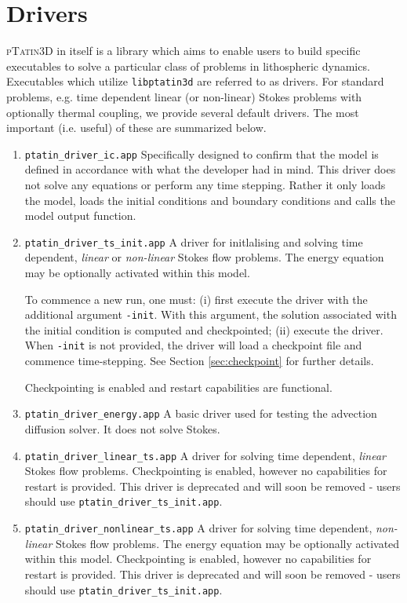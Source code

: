 \documentclass[paper=a4, fontsize=10pt,twoside]{scrartcl}
\newcommand{\ptat}{{{\textsc{pTatin3D}}}}
\newcommand{\unix}[1]{\texttt{\footnotesize #1}}
\begin{document}
\section{Drivers}
{\ptat} in itself is a library which aims to enable users to build specific executables to solve a particular class of problems in lithospheric dynamics.
Executables which utilize \unix{libptatin3d} are referred to as drivers.
For standard problems, e.g. time dependent linear (or non-linear) Stokes problems with optionally thermal coupling, we provide several default drivers.
The most important (i.e. useful) of these are summarized below.

\begin{enumerate}
	\item \unix{ptatin\_driver\_ic.app}
	Specifically designed to confirm that the model is defined in accordance with what the developer had in mind. This driver does not solve any equations or perform any time stepping. Rather it only loads the model, loads the initial conditions and boundary conditions and calls the model output function.

	\item \unix{ptatin\_driver\_ts\_init.app}
	A driver for initlalising and solving time dependent, \emph{linear} or \emph{non-linear} Stokes flow problems. 
	The energy equation may be optionally activated within this model.

	To commence a new run, one must: (i) first execute the driver with the additional argument \texttt{-init}.
	With this argument, the solution associated with the initial condition is computed and checkpointed;
	(ii) execute the driver. When \texttt{-init} is not provided, the driver will load a checkpoint file and commence
	time-stepping. See Section \ref{sec:checkpoint} for further details.

	Checkpointing is enabled and restart capabilities are functional.
	
	\item \unix{ptatin\_driver\_energy.app}
	A basic driver used for testing the advection diffusion solver. It does not solve Stokes.
	
	\item \unix{ptatin\_driver\_linear\_ts.app}
	A driver for solving time dependent, \emph{linear} Stokes flow problems. 
	Checkpointing is enabled, however no capabilities for restart is provided.
	This driver is deprecated and will soon be removed - users should use \unix{ptatin\_driver\_ts\_init.app}.

	\item \unix{ptatin\_driver\_nonlinear\_ts.app}
	A driver for solving time dependent, \emph{non-linear} Stokes flow problems. 
	The energy equation may be optionally activated within this model.
	Checkpointing is enabled, however no capabilities for restart is provided.
	This driver is deprecated and will soon be removed - users should use \unix{ptatin\_driver\_ts\_init.app}.
\end{enumerate}
\end{document}
